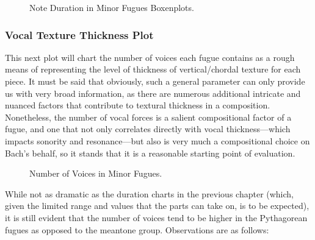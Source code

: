 \begin{figure}[H]
\vspace{1.5em}
    \centering
    \caption{Note Duration in Minor Fugues Boxenplots.}
\end{figure}    \subsubsection{Vocal Texture Thickness
Plot}\label{vocal-texture-thickness-plot}

This next plot will chart the number of voices each fugue contains as a
rough means of representing the level of thickness of vertical/chordal
texture for each piece. It must be said that obviously, such a general
parameter can only provide us with very broad information, as there are
numerous additional intricate and nuanced factors that contribute to
textural thickness in a composition. Nonetheless, the number of vocal
forces is a salient compositional factor of a fugue, and one that not
only correlates directly with vocal thickness---which impacts
sonority and resonance---but also is very much a compositional
choice on Bach's behalf, so it stands that it is a reasonable starting
point of evaluation.




\begin{figure}[H]
\vspace{1.5em}
    \centering
    \caption{Number of Voices in Minor Fugues.}
\end{figure}    While not as dramatic as the duration charts in the previous chapter
(which, given the limited range and values that the parts can take on,
is to be expected), it is still evident that the number of voices tend
to be higher in the Pythagorean fugues as opposed to the meantone group.
Observations are as follows:

